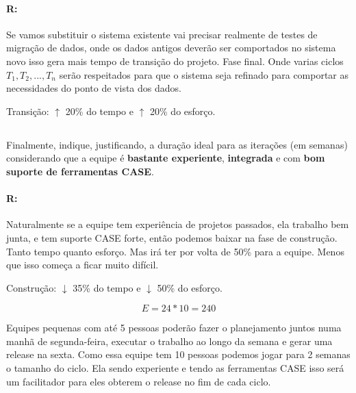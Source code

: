 \documentclass[10pt, a4paper]{report}
\begin{document}
\paragraph{R:}
Se vamos substituir o sistema existente vai precisar realmente de testes de
migração de dados, onde os dados antigos deverão ser comportados no sistema novo
isso gera mais tempo de transição do projeto. Fase final. Onde varias ciclos
$T_1, T_2, ..., T_n$ serão respeitados para que o sistema seja refinado para
comportar as necessidades do ponto de vista dos dados.

\begin{center}
  \begin{Large}
    Transição: $\uparrow$ 20\% do tempo e $\uparrow$ 20\% do esforço.
  \end{Large}
\end{center}

\subsection{}
\qquad Finalmente, indique, justificando, a duração ideal para as iterações (em
semanas) considerando que a equipe é \textbf{bastante experiente},
\textbf{integrada} e com \textbf{bom suporte de ferramentas CASE}.

\paragraph{R:} Naturalmente se a equipe tem experiência de projetos passados,
ela trabalho bem junta, e tem suporte CASE forte, então podemos baixar na fase
de construção. Tanto tempo quanto esforço. Mas irá ter por volta de 50\% para a
equipe. Menos que isso começa a ficar muito difícil.

\begin{center}
  \begin{Large}
    Construção: $\downarrow$ 35\% do tempo e $\downarrow$ 50\% do esforço.
  \end{Large}
\end{center}

$$E = 24 * 10 = 240$$

Equipes pequenas com até 5 pessoas poderão fazer o planejamento juntos numa
manhã de segunda-feira, executar o trabalho ao longo da semana e gerar uma
release na sexta. Como essa equipe tem 10 pessoas podemos jogar para 2 semanas o
tamanho do ciclo. Ela sendo experiente e tendo as ferramentas CASE isso será um
facilitador para eles obterem o release no fim de cada ciclo.
\end{document}
